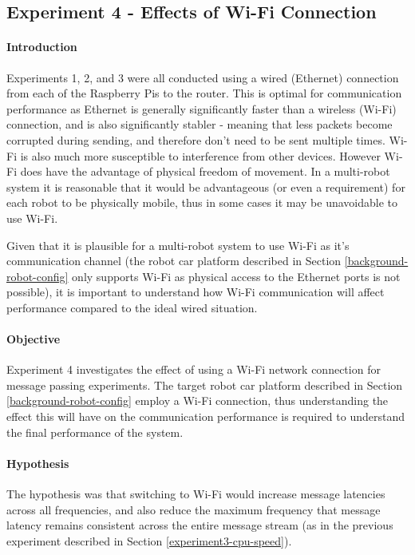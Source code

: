 \documentclass[../dissertation.tex]{subfiles}
\begin{document}
\subsection{Experiment 4 - Effects of Wi-Fi Connection}
\label{exp-4}

\paragraph{Introduction} Experiments 1, 2, and 3 were all conducted using a wired (Ethernet) connection from each of the Raspberry Pis to the router. This is optimal for communication performance as Ethernet is generally significantly faster than a wireless (Wi-Fi) connection, and is also significantly stabler - meaning that less packets become corrupted during sending, and therefore don't need to be sent multiple times. Wi-Fi is also much more susceptible to interference from other devices. However Wi-Fi does have the advantage of physical freedom of movement. In a multi-robot system it is reasonable that it would be advantageous (or even a requirement) for each robot to be physically mobile, thus in some cases it may be unavoidable to use Wi-Fi.

Given that it is plausible for a multi-robot system to use Wi-Fi as it's communication channel (the robot car platform described in Section \ref{background-robot-config} only supports Wi-Fi as physical access to the Ethernet ports is not possible), it is important to understand how Wi-Fi communication will affect performance compared to the ideal wired situation.

\paragraph{Objective} Experiment 4 investigates the effect of using a Wi-Fi network connection for message passing experiments. The target robot car platform described in Section \ref{background-robot-config} employ a Wi-Fi connection, thus understanding the effect this will have on the communication performance is required to understand the final performance of the system.

\paragraph{Hypothesis} The hypothesis was that switching to Wi-Fi would increase message latencies across all frequencies, and also reduce the maximum frequency that message latency remains consistent across the entire message stream (as in the previous experiment described in Section \ref{experiment3-cpu-speed}).
\end{document}
